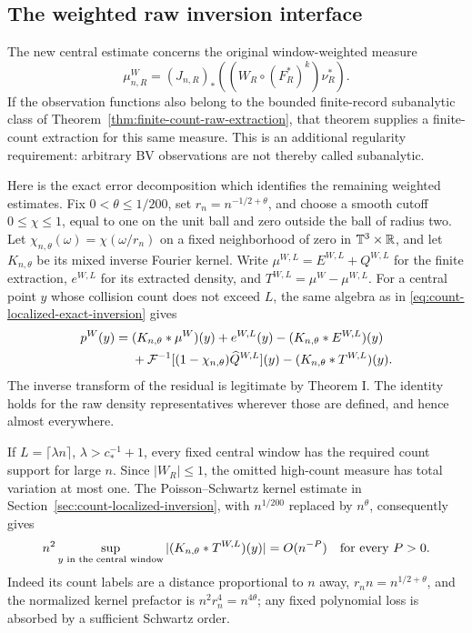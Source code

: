 \subsection{The weighted raw inversion interface}
The new central estimate concerns the original window-weighted
measure
\[
 \mu^W_{n,R}=(J_{n,R})_*
                ((W_R\circ(F_R^*)^k)\nu_R^*).
\]
If the observation functions also belong to the bounded finite-record
subanalytic class of Theorem~\ref{thm:finite-count-raw-extraction},
that theorem supplies a finite-count extraction for this same measure.
This is an additional regularity requirement: arbitrary BV observations
are not thereby called subanalytic.

Here is the exact error decomposition which identifies the remaining
weighted estimates. Fix $0<\theta\le1/200$, set
$r_n=n^{-1/2+\theta}$, and choose a smooth cutoff $0\le\chi\le1$, equal
to one on the unit ball and zero outside the ball of radius two. Let
$\chi_{n,\theta}(\omega)=\chi(\omega/r_n)$ on a fixed neighborhood
of zero in $\mathbb T^3\times\mathbb R$, and let $K_{n,\theta}$ be its mixed
inverse Fourier kernel. Write $\mu^{W,L}=E^{W,L}+Q^{W,L}$ for the
finite extraction, $e^{W,L}$ for its extracted density, and
$T^{W,L}=\mu^W-\mu^{W,L}$. For a central point $y$ whose collision
count does not exceed $L$, the same algebra as in
\eqref{eq:count-localized-exact-inversion} gives
\begin{align}
 p^W(y)={}&(K_{n,\theta}*\mu^W)(y)
       +e^{W,L}(y)-(K_{n,\theta}*E^{W,L})(y)\notag\\
 &+\mathcal F^{-1}[(1-\chi_{n,\theta})\widehat Q^{W,L}](y)
       -(K_{n,\theta}*T^{W,L})(y).
       \label{eq:window-raw-exact-identity}
\end{align}
The inverse transform of the residual is legitimate by Theorem I.
The identity holds for the raw density representatives wherever those
are defined, and hence almost everywhere.

If $L=\lceil\lambda n\rceil$, $\lambda>c_*^{-1}+1$, every fixed
central window has the required count support for large $n$.
Since $|W_R|\le1$, the omitted high-count measure has total variation
at most one. The Poisson--Schwartz kernel estimate in
Section~\ref{sec:count-localized-inversion}, with $n^{1/200}$ replaced
by $n^\theta$, consequently gives
\[
 n^2\sup_{y\text{ in the central window}}
        |(K_{n,\theta}*T^{W,L})(y)|=O(n^{-P})
                    \quad\hbox{for every }P>0.
\]
Indeed its count labels are a distance proportional to $n$ away,
$r_n n=n^{1/2+\theta}$, and the normalized kernel prefactor is
$n^2r_n^4=n^{4\theta}$; any fixed polynomial loss is absorbed by a
sufficient Schwartz order.

